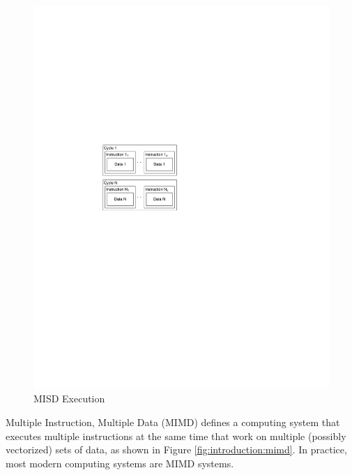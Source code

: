 \begin{figure}[ptb]
	\begin{centering}
		\includegraphics{Introduction/Figures/introduction-misd.pdf}
		\caption{MISD Execution}
		\label{fig:introduction:misd}
	\end{centering}
\end{figure}

Multiple Instruction, Multiple Data (MIMD) defines a computing system that executes multiple instructions at the same time that work on multiple (possibly vectorized) sets of data, as shown in Figure \ref{fig:introduction:mimd}. In practice, most modern computing systems are MIMD systems. \cite{ref:2009-barney-introduction_to_parallel_computing}

